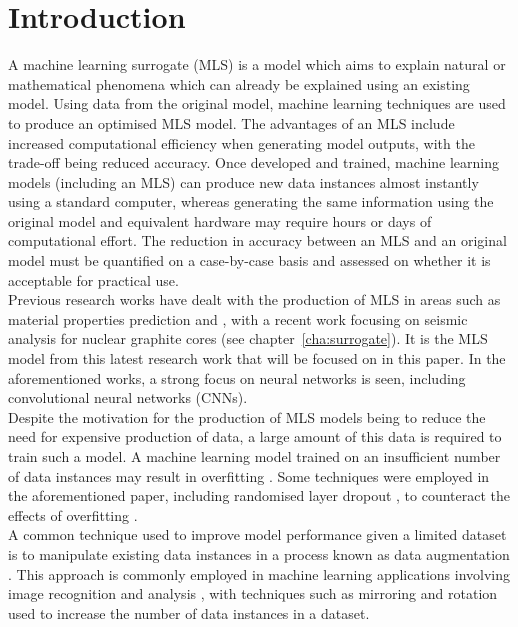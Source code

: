 \section{Introduction}

A machine learning surrogate (MLS) is a model which aims to explain natural or mathematical phenomena which can already be explained using an existing model. Using data from the original model, machine learning techniques are used to produce an optimised MLS model. The advantages of an MLS include increased computational efficiency when generating model outputs, with the trade-off being reduced accuracy. Once developed and trained, machine learning models (including an MLS) can produce new data instances almost instantly using a standard computer, whereas generating the same information using the original model and equivalent hardware may require hours or days of computational effort. The reduction in accuracy between an MLS and an original model must be quantified on a case-by-case basis and assessed on whether it is acceptable for practical use.
\\

\noindent
Previous research works have dealt with the production of MLS in areas such as material properties prediction \cite{nyshadham2019machine} and \cite{asteris2021predicting}, with a recent work focusing on seismic analysis for nuclear graphite cores (see chapter~\ref{cha:surrogate}). It is the MLS model from this latest research work that will be focused on in this paper. In the aforementioned works, a strong focus on neural networks \cite{gurney1997introduction} is seen, including convolutional neural networks (CNNs).
\\

\noindent
Despite the motivation for the production of MLS models being to reduce the need for expensive production of data, a large amount of this data is required to train such a model. A machine learning model trained on an insufficient number of data instances may result in overfitting \cite{hawkins2004problem}. Some techniques were employed in the aforementioned paper, including randomised layer dropout \cite{srivastava2014dropout}, to counteract the effects of overfitting . 
\\

\noindent
A common technique used to improve model performance given a limited dataset is to manipulate existing data instances in a process known as data augmentation \cite{perez2017effectiveness}. This approach is commonly employed in machine learning applications involving image recognition and analysis \cite{hansen2015tiny}, with techniques such as mirroring and rotation used to increase the number of data instances in a dataset.
\\

